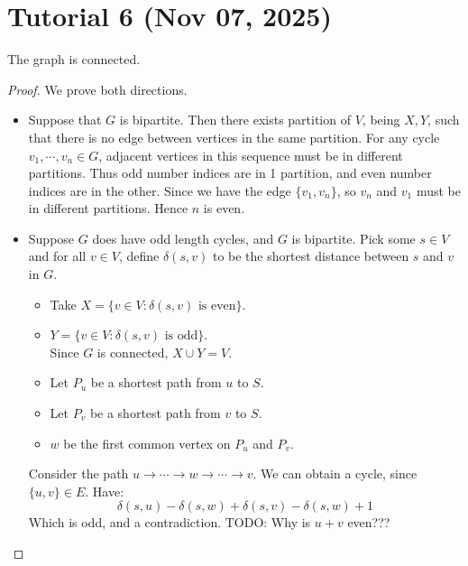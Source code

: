 \section{Tutorial 6 (Nov 07, 2025)}

The graph is connected.

\begin{proof}
    We prove both directions.
\begin{itemize}
    \item[($\Rightarrow$)] Suppose that $G$ is bipartite. Then there exists partition of $V$, being $X, Y$, such that there is no edge between vertices in the same partition. For any cycle $v_1, \cdots, v_n \in G$, adjacent vertices in this sequence must be in different partitions. Thus odd number indices are in 1 partition, and even number indices are in the other. Since we have the edge $\{ v_1, v_n \}$, so $v_n$ and $v_1$ must be in different partitions. Hence $n$ is even. 
    \item[($\Leftarrow$)] Suppose $G$ does have odd length cycles, and $G$ is bipartite. Pick some $s \in V$ and for all $v \in V$, define $\delta(s, v)$ to be the shortest distance between $s$ and $v$ in $G$. 

    \begin{itemize}
    \item Take $X = \{ v \in V : \delta(s, v) \text{ is even} \}$.
    \item $Y = \{ v \in V : \delta(s, v) \text{ is odd} \}$.\\
        Since $G$ is connected, $X \cup Y = V$.
    \item Let $P_u$ be a shortest path from $u$ to $S$.
    \item Let $P_v$ be a shortest path from $v$ to $S$. 
    \item $w$ be the first common vertex on $P_u$ and $P_v$.
    \end{itemize}
    Consider the path $u \to \cdots \to w \to \cdots \to v$. We can obtain a cycle, since $\{ u, v \} \in E$. Have:
    \[
    \delta(s, u) - \delta(s, w) + \delta(s, v) - \delta(s, w) + 1
    \]
    Which is odd, and a contradiction. TODO: Why is $u + v$ even??? 
\end{itemize}
\end{proof}
